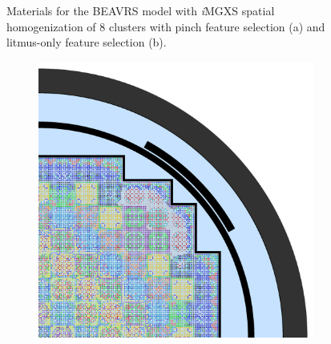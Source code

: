\begin{figure}[h!]
\begin{subfigure}{0.67\textwidth}
  \caption{}
  \label{fig:chap10-full-core-combined-8}
\end{subfigure}
\caption[Materials for BEAVRS with \textit{i}\ac{MGXS} homogenization (8 clusters)]{Materials for the \ac{BEAVRS} model with \textit{i}\ac{MGXS} spatial homogenization of 8 clusters with pinch feature selection (a) and litmus-only feature selection (b).}
\label{fig:chap10-full-core-geometries-8}
\end{figure}

\clearpage

\begin{figure}[h!]
\centering
\begin{subfigure}{0.67\textwidth}
  \centering
  \includegraphics[width=\linewidth]{figures/unsupervised/geometries/with-features/16-clusters/pinch/full-core}
  \caption{}
  \label{fig:chap10-full-core-pinch-16}
\end{subfigure}
\begin{subfigure}{0.67\textwidth}
  \centering

\end{subfigure}
\end{figure}
